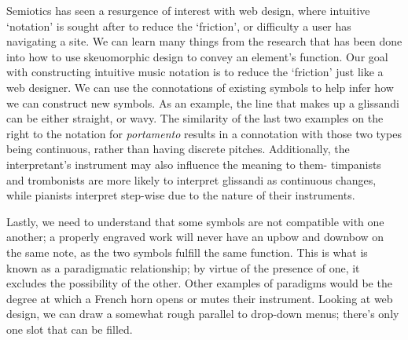 Semiotics has seen a resurgence of interest with web design, where intuitive `notation' is sought after to reduce the `friction', or difficulty a user has navigating a site.
We can learn many things from the research that has been done into how to use skeuomorphic design to convey an element's function.
Our goal with constructing intuitive music notation is to reduce the `friction' just like a web designer.
We can use the connotations of existing symbols to help infer how we can construct new symbols.
As an example, the line that makes up a glissandi can be either straight, or wavy.
The similarity of the last two examples on the right to the notation for \emph{portamento} results in a connotation with those two types being continuous, rather than having discrete pitches.
Additionally, the interpretant's instrument may also influence the meaning to them- timpanists and trombonists are more likely to interpret glissandi as continuous changes, while pianists interpret step-wise due to the nature of their instruments.\autocite[]{}

Lastly, we need to understand that some symbols are not compatible with one another; a properly engraved work will never have an upbow and downbow on the same note, as the two symbols fulfill the same function.
This is what is known as a paradigmatic relationship; by virtue of the presence of one, it excludes the possibility of the other.
Other examples of paradigms would be the degree at which a French horn opens or mutes their instrument.
Looking at web design, we can draw a somewhat rough parallel to drop-down menus; there's only one slot that can be filled.

